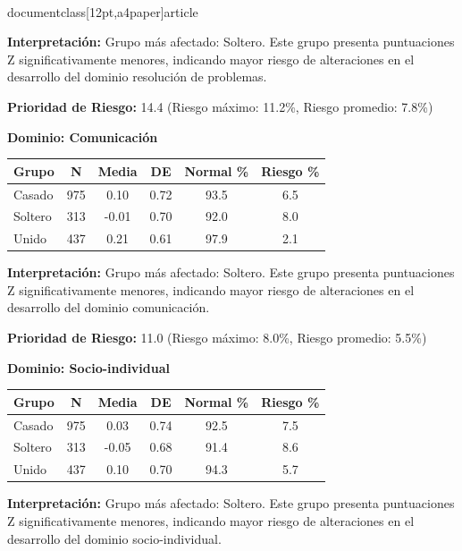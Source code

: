\\documentclass[12pt,a4paper]{article}
\begin{document}
\textbf{Interpretación:} Grupo más afectado: Soltero. Este grupo presenta puntuaciones Z significativamente menores, indicando mayor riesgo de alteraciones en el desarrollo del dominio resolución de problemas.

\textbf{Prioridad de Riesgo:} 14.4 (Riesgo máximo: 11.2\%, Riesgo promedio: 7.8\%)


\vspace{0.5cm}


\textbf{Dominio: Comunicación}


\begin{center}
\begin{tabular}{|l|c|c|c|c|c|}
\hline
\textbf{Grupo} & \textbf{N} & \textbf{Media} & \textbf{DE} & \textbf{Normal \%} & \textbf{Riesgo \%} \\
\hline
Casado & 975 & 0.10 & 0.72 & 93.5 & 6.5 \\
Soltero & 313 & -0.01 & 0.70 & 92.0 & 8.0 \\
Unido & 437 & 0.21 & 0.61 & 97.9 & 2.1 \\

\hline
\end{tabular}
\end{center}


\textbf{Interpretación:} Grupo más afectado: Soltero. Este grupo presenta puntuaciones Z significativamente menores, indicando mayor riesgo de alteraciones en el desarrollo del dominio comunicación.

\textbf{Prioridad de Riesgo:} 11.0 (Riesgo máximo: 8.0\%, Riesgo promedio: 5.5\%)


\vspace{0.5cm}


\textbf{Dominio: Socio-individual}


\begin{center}
\begin{tabular}{|l|c|c|c|c|c|}
\hline
\textbf{Grupo} & \textbf{N} & \textbf{Media} & \textbf{DE} & \textbf{Normal \%} & \textbf{Riesgo \%} \\
\hline
Casado & 975 & 0.03 & 0.74 & 92.5 & 7.5 \\
Soltero & 313 & -0.05 & 0.68 & 91.4 & 8.6 \\
Unido & 437 & 0.10 & 0.70 & 94.3 & 5.7 \\

\hline
\end{tabular}
\end{center}


\textbf{Interpretación:} Grupo más afectado: Soltero. Este grupo presenta puntuaciones Z significativamente menores, indicando mayor riesgo de alteraciones en el desarrollo del dominio socio-individual.
\end{document}
